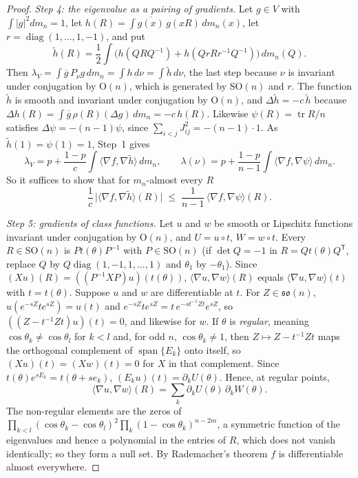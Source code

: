 \documentclass[11pt]{amsart}
\theoremstyle{definition}
\theoremstyle{remark}
\newcommand{\SO}{\mathrm{SO}}
\newcommand{\Or}{\mathrm{O}}
\newcommand{\tr}{\operatorname{tr}}
\newcommand{\ip}[2]{\langle #1,#2\rangle}
\newcommand{\transp}{^{\mathsf T}}
\begin{document}
\begin{proof}
\emph{Step 4: the eigenvalue as a pairing of gradients.}  Let $g\in V$ with $\int|g|^2dm_n=1$, let
$h(R)=\int\overline{g(x)}\,g(xR)\,dm_n(x)$, let $r=\operatorname{diag}(1,\dots,1,-1)$, and put
\[
  \tilde h(R)=\frac12\int\bigl(h(QRQ^{-1})+h(QrRr^{-1}Q^{-1})\bigr)\,dm_n(Q).
\]
Then $\lambda_V=\int\overline g\,P_\nu g\,dm_n=\int h\,d\nu=\int\tilde h\,d\nu$, the last step because $\nu$
is invariant under conjugation by $\Or(n)$, which is generated by $\SO(n)$ and $r$.  The function
$\tilde h$ is smooth and invariant under conjugation by $\Or(n)$, and $\Delta\tilde h=-c\,\tilde h$
because $\Delta h(R)=\int\overline g\,\rho(R)(\Delta g)\,dm_n=-c\,h(R)$.  Likewise $\psi(R)=\tr R/n$
satisfies $\Delta\psi=-(n-1)\psi$, since $\sum_{i<j}J_{ij}^2=-(n-1)\cdot1$.  As
$\tilde h(1)=\psi(1)=1$, Step~1 gives
\[
  \lambda_V=p+\frac{1-p}c\int\ip{\nabla f}{\nabla\tilde h}\,dm_n,\qquad
  \lambda(\nu)=p+\frac{1-p}{n-1}\int\ip{\nabla f}{\nabla\psi}\,dm_n .
\]
So it suffices to show that for $m_n$-almost every $R$
\begin{equation}\label{eq:pointwise}
  \frac1c\,\bigl|\ip{\nabla f}{\nabla\tilde h}(R)\bigr|\;\le\;\frac1{n-1}\,\ip{\nabla f}{\nabla\psi}(R).
\end{equation}

\emph{Step 5: gradients of class functions.}  Let $u$ and $w$ be smooth or Lipschitz functions
invariant under conjugation by $\Or(n)$, and $U=u\circ t$, $W=w\circ t$.  Every $R\in\SO(n)$ is
$Pt(\theta)P^{-1}$ with $P\in\SO(n)$ (if $\det Q=-1$ in $R=Qt(\theta)Q\transp$, replace $Q$ by
$Q\operatorname{diag}(1,-1,1,\dots,1)$ and $\theta_1$ by $-\theta_1$).  Since
$(Xu)(R)=((P^{-1}XP)u)(t(\theta))$, $\ip{\nabla u}{\nabla w}(R)$ equals
$\ip{\nabla u}{\nabla w}(t)$ with $t=t(\theta)$.  Suppose $u$ and $w$ are differentiable at $t$.
For $Z\in\mathfrak{so}(n)$, $u(e^{-sZ}te^{sZ})=u(t)$ and $e^{-sZ}te^{sZ}=t\,e^{-st^{-1}Zt}e^{sZ}$, so
$((Z-t^{-1}Zt)u)(t)=0$, and likewise for $w$.  If $\theta$ is \emph{regular}, meaning
$\cos\theta_k\ne\cos\theta_l$ for $k<l$ and, for odd $n$, $\cos\theta_k\ne1$, then
$Z\mapsto Z-t^{-1}Zt$ maps the orthogonal complement of $\operatorname{span}\{E_k\}$ onto itself,
so $(Xu)(t)=(Xw)(t)=0$ for $X$ in that complement.  Since $t(\theta)e^{sE_k}=t(\theta+se_k)$,
$(E_ku)(t)=\partial_kU(\theta)$.  Hence, at regular points,
\[
  \ip{\nabla u}{\nabla w}(R)=\sum_k\partial_kU(\theta)\,\partial_kW(\theta).
\]
The non-regular elements are the zeros of
$\prod_{k<l}(\cos\theta_k-\cos\theta_l)^2\prod_k(1-\cos\theta_k)^{n-2m}$, a symmetric function of
the eigenvalues and hence a polynomial in the entries of $R$, which does not vanish identically;
so they form a null set.  By Rademacher's theorem $f$ is differentiable almost everywhere.


\end{proof}
\end{document}
